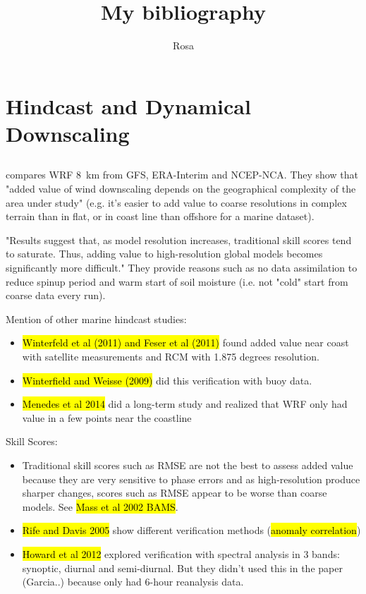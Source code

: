\documentclass[12pt,a4paper]{article}
\title{My bibliography}
\author{Rosa}
\begin{document}
\maketitle
\tableofcontents

\section{Hindcast and Dynamical Downscaling }

\citet{Zagar2006}

\subsection{\cite{Garcia-Diez2015}}
\cite{Garcia-Diez2015} compares \gls{WRF} 8~km from \gls{GFS}, ERA-Interim and NCEP-NCA. They show that "added value of wind downscaling depends on the geographical complexity of the area under study" (e.g. it's easier to add value to coarse resolutions in complex terrain than in flat, or in coast line than offshore for a marine dataset). 

"Results suggest that, as model resolution increases, traditional skill scores tend to saturate. Thus, adding value to high-resolution global models becomes significantly more difficult." They provide reasons such as no data assimilation to reduce spinup period and warm start of soil moisture (i.e. not "cold" start from coarse data every run).

Mention of other marine hindcast studies:
\begin{itemize}
\item \hl{Winterfeld et al (2011) and Feser et al (2011)} found added value near coast with satellite measurements and RCM with 1.875 degrees resolution. 
\item \hl{Winterfield and Weisse (2009)} did this verification with buoy data.
\item \hl{Menedes et al 2014} did a long-term study and realized that WRF only had value in a few points near the coastline
\end{itemize}

Skill Scores:
\begin{itemize}
\item Traditional skill scores such as RMSE are not the best to assess added value because they are very sensitive to phase errors and as high-resolution produce sharper changes, scores such as RMSE appear to be worse than coarse models. See \hl{Mass et al 2002 BAMS}. 
\item \hl{Rife and Davis 2005} show different verification methods (\hl{anomaly correlation})
\item \hl{Howard et al 2012} explored verification with spectral analysis in 3 bands: synoptic, diurnal and semi-diurnal. But they didn't used this in the paper (Garcia..) because only had 6-hour reanalysis data.
\end{itemize}
\end{document}
